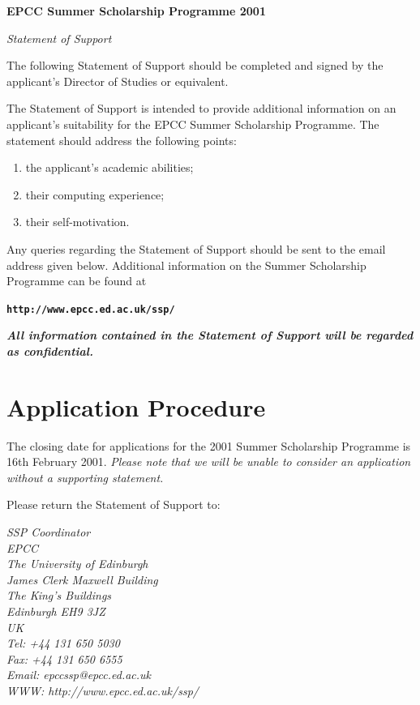 \documentclass[a4paper]{article}
\begin{document}
\centerline{\LARGE \bf EPCC Summer Scholarship Programme 2001}
\vskip 2mm

\centerline{\LARGE \it Statement of Support}
\vskip 2mm

The following Statement of Support should be completed and signed by the
applicant's Director of Studies or equivalent.

The Statement of Support is intended to provide additional information on
an applicant's suitability for the EPCC Summer Scholarship Programme.  The
statement should address the following points:

\begin{enumerate}
\item the applicant's academic abilities;
\item their computing experience;
\item their self-motivation.
\end{enumerate}

Any queries regarding the Statement of Support should be sent to the email
address given below.  Additional information on the Summer Scholarship
Programme can be found at

{\bf {\tt http://www.epcc.ed.ac.uk/ssp/}}

{\it {\bf All information contained in the Statement of Support will be
  regarded as confidential.}}


\section*{Application Procedure}

The closing date for applications for the 2001 Summer Scholarship Programme
is 16th February 2001.  {\em Please note that we will be unable to consider
  an application without a supporting statement.}

Please return the Statement of Support to:

\begin{center}
\begin{small}
{\it
SSP Coordinator\\
EPCC\\
The University of Edinburgh\\
James Clerk Maxwell Building\\
The King's Buildings\\
Edinburgh EH9 3JZ\\
UK\\
Tel: +44 131 650 5030\\
Fax: +44 131 650 6555\\
Email: epccssp@epcc.ed.ac.uk\\
WWW: http://www.epcc.ed.ac.uk/ssp/
}
\end{small}
\end{center}
\end{document}

